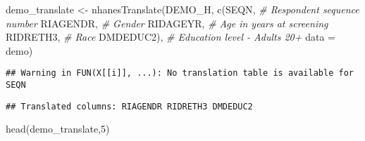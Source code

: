 \documentclass[
]{book}
\newenvironment{Shaded}{\begin{snugshade}}{\end{snugshade}}
\newcommand{\AttributeTok}[1]{\textcolor[rgb]{0.77,0.63,0.00}{#1}}
\newcommand{\CommentTok}[1]{\textcolor[rgb]{0.56,0.35,0.01}{\textit{#1}}}
\newcommand{\DecValTok}[1]{\textcolor[rgb]{0.00,0.00,0.81}{#1}}
\newcommand{\FunctionTok}[1]{\textcolor[rgb]{0.00,0.00,0.00}{#1}}
\newcommand{\NormalTok}[1]{#1}
\newcommand{\OtherTok}[1]{\textcolor[rgb]{0.56,0.35,0.01}{#1}}
\newcommand{\StringTok}[1]{\textcolor[rgb]{0.31,0.60,0.02}{#1}}
\begin{document}
\begin{Shaded}
\begin{Highlighting}[]
\NormalTok{demo\_translate }\OtherTok{\textless{}{-}} \FunctionTok{nhanesTranslate}\NormalTok{(}\StringTok{\textquotesingle{}DEMO\_H\textquotesingle{}}\NormalTok{,}
                                  \FunctionTok{c}\NormalTok{(}\StringTok{\textquotesingle{}SEQN\textquotesingle{}}\NormalTok{, }\CommentTok{\# Respondent sequence number}
                                    \StringTok{\textquotesingle{}RIAGENDR\textquotesingle{}}\NormalTok{, }\CommentTok{\# Gender}
                                    \StringTok{\textquotesingle{}RIDAGEYR\textquotesingle{}}\NormalTok{, }\CommentTok{\# Age in years at screening}
                                    \StringTok{\textquotesingle{}RIDRETH3\textquotesingle{}}\NormalTok{, }\CommentTok{\# Race}
                                    \StringTok{\textquotesingle{}DMDEDUC2\textquotesingle{}}\NormalTok{), }\CommentTok{\# Education level {-} Adults 20+}
                                 \AttributeTok{data =}\NormalTok{ demo)}
\end{Highlighting}
\end{Shaded}

\begin{verbatim}
## Warning in FUN(X[[i]], ...): No translation table is available for SEQN
\end{verbatim}

\begin{verbatim}
## Translated columns: RIAGENDR RIDRETH3 DMDEDUC2
\end{verbatim}

\begin{Shaded}
\begin{Highlighting}[]
\FunctionTok{head}\NormalTok{(demo\_translate,}\DecValTok{5}\NormalTok{)}
\end{Highlighting}
\end{Shaded}
\end{document}

